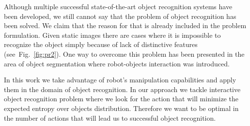 \documentclass[conference]{IEEEtran}
\newcommand{\figref}[1]{Fig.~\ref{#1}}
\begin{document}
Although multiple successful state-of-the-art object recognition systems have been developed, we still cannot say that the problem of object recognition has been solved.
We claim that the reason for that is already included in the problem formulation. Given static images there are cases where it is impossible to recognize the object simply because of lack of distinctive features (see~\figref{fig:pr2}). One way to overcome this problem has been presented in the area of object segmentation where robot-objects interaction was introduced. 

In this work we take advantage of robot's manipulation capabilities and apply them in the domain of object recognition. In our approach we tackle interactive object recognition problem where we look for the action that will minimize the expected entropy over objects distribution. Therefore we want to be optimal in the number of actions that will lead us to successful object recognition.
\end{document}

